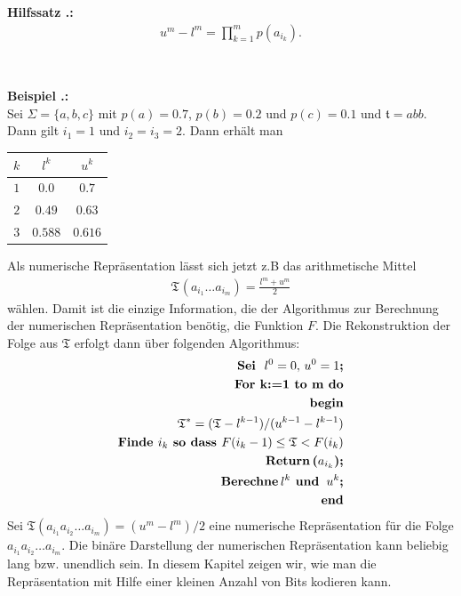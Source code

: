 \documentclass[a4paper,12pt]{article}
\newcounter{Hilfssatz}
\newcounter{Beispiel}
\newcounter{Algorithmus}
\newenvironment{Hilfssatz}{
\medskip
        
        \setlength{\parindent}{0pt}
        \addtocounter{Hilfssatz}{1}
        \textbf{\textsf{Hilfssatz \thesubsection.\theHilfssatz}:}\\}{
        \nopagebreak
        \vspace{-1.0ex}
        \bigskip\\
        
}
\newenvironment{Beispiel}{
\medskip
        
        \setlength{\parindent}{0pt}
        \addtocounter{Beispiel}{1}
        \textbf{\textsf{Beispiel \thesubsection.\theBeispiel}:}\\}{
        \nopagebreak
        \vspace{-1.0ex}
        \bigskip
        
}
\begin{document}
\begin{Hilfssatz}
\begin{align*}
u^{m} - l^{m} = \prod_{k=1}^{m}p(a_{i_{k}}).
\end{align*}
\end{Hilfssatz}
\begin{Beispiel}
Sei $\Sigma = \{a,b,c\}$ mit $p(a)=0.7$, $p(b) =0.2$ und $p(c)=0.1$ und $\mathfrak{t}=abb$.
Dann gilt $i_1=1$ und $i_2=i_3 =2$.
Dann erhält man
\begin{center}
\begin{tabular}{c|c|c}
$k$ & $l^k$ & $u^k$
\\
\hline
$1$ & $0.0$ & $0.7$
\\
\hline
$2$ & $0.49$ & $ 0.63$ 
\\
\hline
$3$ & $0.588$ & $0.616$
\end{tabular}
\end{center}
\end{Beispiel}
Als numerische Repräsentation lässt sich jetzt z.B das arithmetische Mittel
\begin{align*}
\mathfrak{T}^{}(a_{i_{1}}\ldots a_{i_{m}})= \frac{l^{m} + u^{m}}{2}
\end{align*}
wählen. Damit ist die einzige Information, die der Algorithmus zur Berechnung der numerischen Repräsentation benötig, die Funktion $F$. Die Rekonstruktion der Folge aus $\mathfrak{T}$ erfolgt dann über folgenden Algorithmus:
\begin{align*}
\textbf{\text{Sei}\; $l^{0}=0,\,u^{0}=1$;}
\\
\textbf{\text{For k:=1 to m do}}
\\
\textbf{\text{begin}}
\\
\mathfrak{T}^{*}= (\mathfrak{T} - l^{k-1}) / (u^{k-1} - l^{k-1})
\\
\textbf{\text{Finde $i_k$ so dass $F(i_k -1) \leq \mathfrak{T} < F(i_k)$}}
\\
\textbf{\text{Return}\,($a_{i_{k}}$);}
\\
 \textbf{\text{Berechne}\,$l^{k}$ \textbf{und}\, $u^{k}$;}
\\
\textbf{\text{end}}
\end{align*}
Sei $\mathfrak{T}(a_{i_{1}}a_{i_{2}}\ldots a_{i_{m}}) = (u^{m} - l^{m})/2$ eine numerische Repräsentation für die Folge $a_{i_{1}}a_{i_{2}}\ldots a_{i_{m}}$. Die binäre Darstellung der numerischen Repräsentation kann  beliebig lang bzw. unendlich sein. In diesem Kapitel zeigen wir, wie man die Repräsentation mit Hilfe einer kleinen Anzahl von Bits kodieren kann. 
\par
\end{document}
